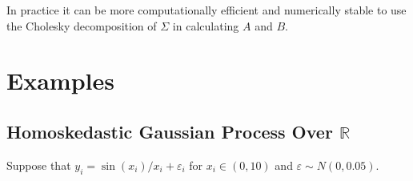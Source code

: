 \documentclass{article}
\newcommand{\RR}{\mathbb{R}}
\newcommand{\ep}{\varepsilon}
\begin{document}
\noindent In practice it can be more computationally efficient and numerically stable to use the Cholesky decomposition of $\Sigma$ in calculating $A$ and $B$.

\section{Examples}

\subsection{Homoskedastic Gaussian Process Over $\RR$}

Suppose that $y_i = \sin(x_i) / x_i + \ep_i$ for $x_i\in(0, 10)$ and $\ep\sim N(0, 0.05)$. 
\end{document}
